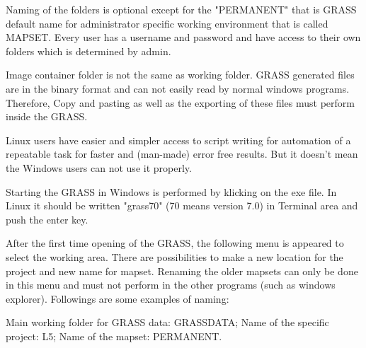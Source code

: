 Naming of the folders is optional except for the "PERMANENT" that is GRASS default name for administrator specific working environment that is called MAPSET. Every user has a username and password and have access to their own folders which is determined by admin. \newline

Image container folder is not the same as working folder. GRASS generated files are in the binary format and can not easily read by normal windows programs. Therefore, Copy and pasting as well as the exporting of these files must perform inside the GRASS. \newline

Linux users have easier and simpler access to script writing for automation of a repeatable task for faster and (man-made) error free results. But it doesn't mean the Windows users can not use it properly.\newline

Starting the GRASS in Windows is performed by klicking on the exe file. In Linux it should be written "grass70" (70 means version 7.0) in Terminal area and push the enter key.\newline
 
After the first time opening of the GRASS, the following menu is appeared to select the working area. There are possibilities to make a new location for the project and new name for mapset. Renaming the older mapsets can only be done in this menu and must not perform in the other programs (such as windows explorer). Followings are some examples of naming:\newline

Main working folder for GRASS data: GRASSDATA;\newline
Name of the specific project: L5;\newline
Name of the mapset: PERMANENT.\newline


